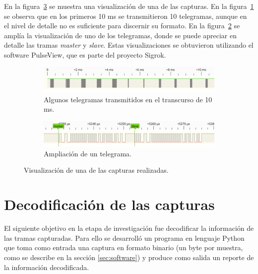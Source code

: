 En la figura~\ref{fig:pulseview} se muestra una visualización de una de las capturas.
En la figura~\ref{fig:pulseview-10ms} se observa que en los primeros 10 ms se transmitieron 10 telegramas, aunque en el nivel de detalle no es suficiente para discernir su formato.
En la figura~\ref{fig:pulseview-telegrama} se amplía la visualización de uno de los telegramas, donde se puede apreciar en detalle las tramas \textit{master} y \textit{slave}.
Estas visualizaciones se obtuvieron utilizando el software PulseView, que es parte del proyecto Sigrok.

\begin{figure}[htbp!]
	\centering
    \begin{subfigure}[b]{\textwidth}
        \centering
        \includegraphics[width=\textwidth]{./Figures/pulseview-10ms.png}
        \caption{Algunos telegramas transmitidos en el transcurso de 10 ms.}
        \label{fig:pulseview-10ms}
    \end{subfigure}
    \par\bigskip
    \begin{subfigure}[b]{\textwidth}
        \centering
        \includegraphics[width=1\textwidth]{./Figures/pulseview-telegrama.png}
        \caption{Ampliación de un telegrama.}
        \label{fig:pulseview-telegrama}
    \end{subfigure}
    \caption{Visualización de una de las capturas realizadas.}
    \label{fig:pulseview}
\end{figure}

\section{Decodificación de las capturas}
\label{sec:decodificacion}

El siguiente objetivo en la etapa de investigación fue decodificar la información de las tramas capturadas. Para ello se desarrolló un programa en lenguaje Python que toma como entrada una captura en formato binario (un byte por muestra, como se describe en la sección \ref{sec:software}) y produce como salida un reporte de la información decodificada.

